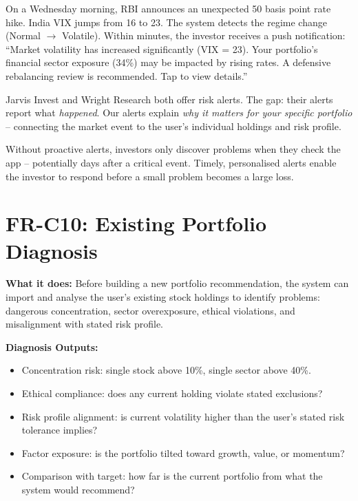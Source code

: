 \documentclass[12pt, a4paper, openany, oneside]{report}
\begin{document}
\begin{examplebox}
On a Wednesday morning, RBI announces an unexpected 50 basis point rate hike. India VIX jumps from 16 to 23. The system detects the regime change (Normal $\rightarrow$ Volatile). Within minutes, the investor receives a push notification: ``Market volatility has increased significantly (VIX = 23). Your portfolio's financial sector exposure (34\%) may be impacted by rising rates. A defensive rebalancing review is recommended. Tap to view details.''
\end{examplebox}

\begin{gapbox}
Jarvis Invest and Wright Research both offer risk alerts. The gap: their alerts report what \textit{happened}. Our alerts explain \textit{why it matters for your specific portfolio} -- connecting the market event to the user's individual holdings and risk profile.
\end{gapbox}

\begin{valuebox}
Without proactive alerts, investors only discover problems when they check the app -- potentially days after a critical event. Timely, personalised alerts enable the investor to respond before a small problem becomes a large loss.
\end{valuebox}

\section{FR-C10: Existing Portfolio Diagnosis}

\textbf{What it does:} Before building a new portfolio recommendation, the system can import and analyse the user's existing stock holdings to identify problems: dangerous concentration, sector overexposure, ethical violations, and misalignment with stated risk profile.

\textbf{Diagnosis Outputs:}
\begin{itemize}
  \item Concentration risk: single stock above 10\%, single sector above 40\%.
  \item Ethical compliance: does any current holding violate stated exclusions?
  \item Risk profile alignment: is current volatility higher than the user's stated risk tolerance implies?
  \item Factor exposure: is the portfolio tilted toward growth, value, or momentum?
  \item Comparison with target: how far is the current portfolio from what the system would recommend?
\end{itemize}
\end{document}
